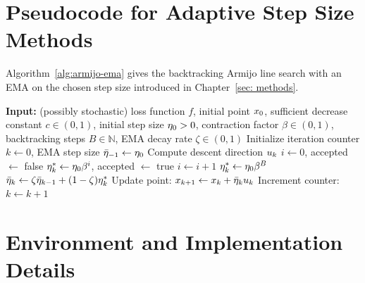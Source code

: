 \renewcommand{\bibname}{References}



\appendix
\chapter{Pseudocode for Adaptive Step Size Methods} \label{app_algo_pseudocode}
Algorithm~\ref{alg:armijo-ema} gives the backtracking Armijo line search with an EMA on the chosen step size introduced in Chapter~\ref{sec: methods}. 

\begin{algorithm}[H]
    \caption{Backtracking Armijo Line Search with EMA}
    \label{alg:armijo-ema}
    \begin{algorithmic}[1]
        \State \textbf{Input:} (possibly stochastic) loss function $f$, initial point $x_{0}$, sufficient decrease constant $c \in (0, 1)$, initial step size $\eta_0 > 0$, contraction factor $\beta \in (0, 1)$, backtracking steps $B \in \mathbb{N}$, EMA decay rate $\zeta \in (0, 1)$
        \State Initialize iteration counter $k \gets 0$, EMA step size $\bar{\eta}_{-1} \gets \eta_0$
            \State Compute descent direction $u_{k}$ 
            \State $i \gets 0$, accepted $\gets$ false
                    \State $\eta_{k}^* \gets \eta_0 \beta^i$, accepted $\gets$ true
                \Else
                    \State $i \gets i + 1$
                \EndIf
            \EndWhile
                \State $\eta_{k}^* \gets \eta_0 \beta^B$ 
            \EndIf
            \State $\bar{\eta}_k \gets \zeta \bar{\eta}_{k-1} + (1 - \zeta) \eta_{k}^*$ 
            \State Update point: $x_{k+1} \gets x_{k} + \bar{\eta}_k u_{k}$
            \State Increment counter: $k \gets k + 1$
        \EndFor
    \end{algorithmic}
\end{algorithm}

\chapter{Environment and Implementation Details}

